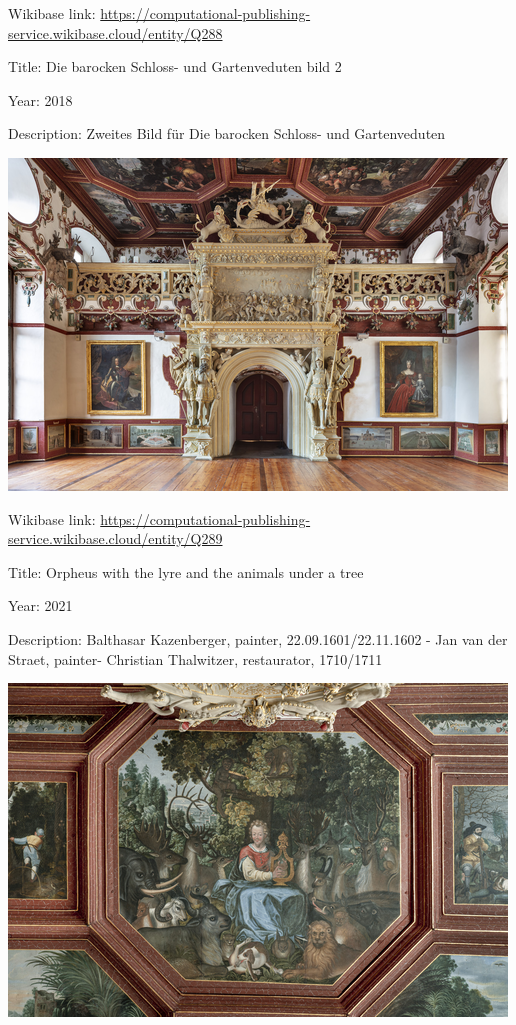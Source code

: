\documentclass[
  letterpaper,
]{book}
\begin{document}
Wikibase link:
\url{https://computational-publishing-service.wikibase.cloud/entity/Q288}

Title: Die barocken Schloss- und Gartenveduten bild 2

Year: 2018

Description: Zweites Bild für Die barocken Schloss- und Gartenveduten

\includegraphics{paintings_files/figure-pdf/cell-3-output-50.png}

Wikibase link:
\url{https://computational-publishing-service.wikibase.cloud/entity/Q289}

Title: Orpheus with the lyre and the animals under a tree

Year: 2021

Description: Balthasar Kazenberger, painter, 22.09.1601/22.11.1602 - Jan
van der Straet, painter- Christian Thalwitzer, restaurator, 1710/1711

\includegraphics{paintings_files/figure-pdf/cell-3-output-52.png}
\end{document}
